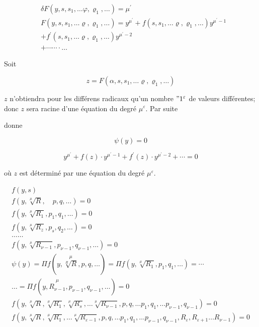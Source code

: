 \documentclass{article}
\begin{document}
\[
\begin{aligned}
& \delta F\left(y, s, s_{1}, \ldots \varphi, \varrho_{1}, \ldots\right)=\mu^{\prime} \\
& F\left(y, s, s_{1}, \ldots \varrho, \varrho_{1}, \ldots\right)=y^{\mu^{\prime}}+f\left(s, s_{1}, \ldots \varrho, \varrho_{1}, \ldots\right) y^{\mu^{\prime}-1} \\
& +f^{\prime}\left(s, s_{1}, \ldots \varrho, \varrho_{1}, \ldots\right) y^{\mu^{\prime}-2} \\
& +\cdots \cdots \cdot \ldots
\end{aligned}
\]

Soit

\[
z=F\left(\alpha, s, s_{1}, \ldots \varrho, \varrho_{1}, \ldots\right)
\]

\(z\) n'obtiendra pour les différens radicaux qu'un nombre \(" 1^{\varepsilon}\) de valeurs différentes; donc \(z\) sera racine d'une équation du degré \(\mu^{\varepsilon}\). Par suite

donne

\[
\psi(y)=0
\]

\[
y^{\mu^{\prime}}+f(z) \cdot y^{\mu^{\prime}-1}+f^{\prime}(z) \cdot y^{\mu^{\prime}-2}+\cdots=0
\]

où \(z\) est déterminé par une équation du degré \(\mu^{\varepsilon}\).

\[
\begin{gathered}
f(y, s) \\
f(y, \sqrt[\mu]{R}, \quad p, q, \ldots)=0 \\
f\left(y, \sqrt[\mu]{R_{1}}, p_{1}, q_{1}, \ldots\right)=0 \\
f\left(y, \sqrt[\mu]{R_{z}}, p_{s}, q_{2}, \ldots\right)=0 \\
\ldots \ldots \\
f\left(y, \sqrt[\mu]{R_{\nu-1}}, p_{\nu-1}, q_{\nu-1}, \ldots\right)=0 \\
\psi(y)=\Pi f(y, \stackrel{\mu}{\sqrt[R]{R}}, p, q, \ldots)=\Pi f\left(y, \sqrt[\mu]{R_{1}}, p_{1}, q_{1}, \ldots\right)=\cdots \\
\ldots=\Pi f\left(y, \stackrel{\mu}{R_{\nu-1}}, p_{\nu-1}, q_{\nu-1}, \ldots\right)=0 \\
f\left(y, \sqrt[\mu]{R}, \sqrt[\mu]{R_{1}}, \sqrt[\mu]{R_{s}}, \ldots \sqrt[\mu]{R_{\nu-1}}, p, q, \ldots p_{1}, q_{1}, \ldots p_{\nu-1}, q_{\nu-1}\right)=0 \\
f\left(y, \sqrt[\mu]{R}, \sqrt[\mu]{R_{1}}, \ldots \sqrt[\mu]{R_{\varepsilon-1}}, p, q, \ldots p_{1}, q_{1}, \ldots p_{\nu-1}, q_{\nu-1}, R_{\varepsilon}, R_{\varepsilon+1} \ldots R_{\nu-1}\right)=0
\end{gathered}
\]
\end{document}
